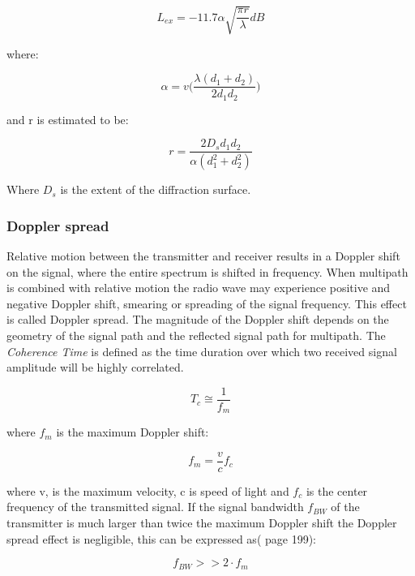 \begin{equation}
    L_{ex} = -11.7 \alpha\sqrt{\frac{\pi r}{\lambda}} dB
\end{equation}

where:

\begin{equation}
    \alpha = v\Big(\frac{\lambda(d_1+d_2)}{2d_1d_2}\Big)
\end{equation}

and r is estimated to be:

\begin{equation}
    r = \frac{2D_sd_1d_2}{\alpha(d_1^2+d_2^2)}
\end{equation}

Where $D_s$ is the extent of the diffraction surface. 

\subsubsection{Doppler spread}
Relative motion between the transmitter and receiver results in a Doppler shift\cite{DopplerShift} on the signal, where the entire spectrum is shifted in frequency. When multipath is combined with relative motion the radio wave may experience positive and negative Doppler shift, smearing or spreading of the signal frequency. This effect is called Doppler spread. The magnitude of the Doppler shift depends on the geometry of the signal path and the reflected signal path for multipath. The  \textit{Coherence Time} is defined as the time duration over which two received signal amplitude will be highly correlated.

\begin{equation}
    T_c \cong \frac{1}{f_m}
\end{equation}

where $f_m$ is the maximum Doppler shift:

\begin{equation}
    f_m = \frac{ v}{c}f_c
\end{equation}

where v, is the maximum velocity, c is speed of light and $f_c$ is the center frequency of the transmitted signal. If the signal bandwidth $f_{BW}$ of the transmitter is much larger than twice the maximum Doppler shift the Doppler spread effect is negligible, this can be expressed as(\cite{RFpropagation} page 199):

\begin{equation}
    f_{BW} >> 2 \cdot f_m
\end{equation}

